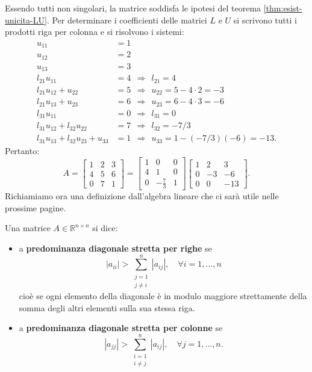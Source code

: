 Essendo tutti non singolari, la matrice soddisfa le ipotesi del teorema \ref{thm:esist-unicita-LU}.
Per determinare i coefficienti delle matrici $L$ e $U$ si scrivono tutti i prodotti riga per colonna e si risolvono i sistemi:
\begin{align*}
u_{11} & =1\\
u_{12} & =2\\
u_{13} & =3\\
l_{21} u_{11} & =4\ \ \Rightarrow \ \ l_{21} =4\\
l_{21} u_{12} +u_{22} & =5\ \ \Rightarrow \ \ u_{22} =5-4\cdot 2=-3\\
l_{21} u_{13} +u_{23} & =6\ \ \Rightarrow \ \ u_{23} =6-4\cdot 3=-6\\
l_{31} u_{11} & =0\ \ \Rightarrow \ \ l_{31} =0\\
l_{31} u_{12} +l_{32} u_{22} & =7\ \ \Rightarrow \ \ l_{32} =-7/3\\
l_{31} u_{13} +l_{32} u_{23} +u_{33} & =1\ \ \Rightarrow \ \ u_{33} =1-( -7/3)( -6) =-13.
\end{align*}
Pertanto:
\begin{equation*}
A=\begin{bmatrix}
1 & 2 & 3\\
4 & 5 & 6\\
0 & 7 & 1
\end{bmatrix} =\begin{bmatrix}
1 & 0 & 0\\
4 & 1 & 0\\
0 & -\frac{7}{3} & 1
\end{bmatrix}\begin{bmatrix}
1 & 2 & 3\\
0 & -3 & -6\\
0 & 0 & -13
\end{bmatrix}.
\end{equation*}
Richiamiamo ora una definizione dall'algebra lineare che ci sarà utile nelle prossime pagine.
\begin{definition}
  Una matrice $A\in \mathbb{R} ^{n\times n} $ si dice:
  \begin{itemize}
      \item a \textbf{predominanza diagonale stretta per righe} se
      \begin{equation*}
          |a_{ii} | >\sum ^{n}_{\substack{j=1\\j\neq i}} |a_{ij} |,\quad \forall i=1,\dotsc ,n
      \end{equation*}
      cioè se ogni elemento della diagonale è in modulo maggiore strettamente della somma degli altri elementi sulla sua stessa riga.
      \item a \textbf{predominanza diagonale stretta per colonne} se
      \begin{equation*}
          |a_{jj} | >\sum ^{n}_{\substack{i=1\\i\neq j}} |a_{ij} |,\quad \forall j=1,\dotsc ,n.
      \end{equation*}
  \end{itemize}
\end{definition}

